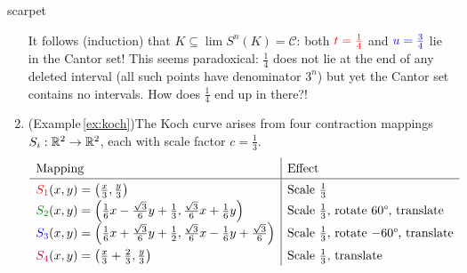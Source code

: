 \begin{examples}{}{scarpet}
\begin{enumerate}
 		It follows (induction) that $K\subseteq\lim S^n(K)=\mathcal C$: both $\textcolor{red}{t=\frac 14}$ and $\textcolor{blue}{u=\frac 34}$ lie in the Cantor set! This seems paradoxical: $\frac 14$ does not lie at the end of any deleted interval (all such points have denominator $3^n$) but yet the Cantor set contains no intervals. How does $\frac 14$ end up in there?!
 	
 		\goodbreak
	
		\item\label{ex:kochrevisit} (Example\,\ref{ex:koch})\lstsp The Koch curve arises from four contraction mappings $S_i:\mathbb{R}^2\to\mathbb{R}^2$, each with scale factor $c=\frac 13$.
		\[
			\renewcommand\arraystretch{1.4}
			\begin{array}{l|l}
				\text{Mapping}&\text{Effect}\\\hline
				\displaystyle \textcolor{red}{S_1}(x,y)=\left(\tfrac x3,\tfrac y3\right)
				&
				\text{Scale $\frac 13$}
				\\
				\displaystyle \textcolor{Green}{S_2}(x,y)=\left(\tfrac 16x-\tfrac{\sqrt 3}6y+\tfrac 13,\tfrac{\sqrt 3}6x+\tfrac 16y\right)
				&
				\text{Scale $\frac 13$, rotate \ang{60}, translate}
				\\
				\displaystyle \textcolor{blue}{S_3}(x,y)=\left(\tfrac 16x+\tfrac{\sqrt 3}6y+\tfrac 12,\tfrac{\sqrt 3}6x-\tfrac 16y+\tfrac{\sqrt 3}6\right)
				&
				\text{Scale $\frac 13$, rotate $-\ang{60}$, translate}
				\\
				\displaystyle \textcolor{purple}{S_4}(x,y)=\left(\tfrac x3+\tfrac 23,\tfrac y3\right)
				&
				\text{Scale $\frac 13$, translate}
			\end{array}
		\]
		

\end{enumerate}
\end{examples}
